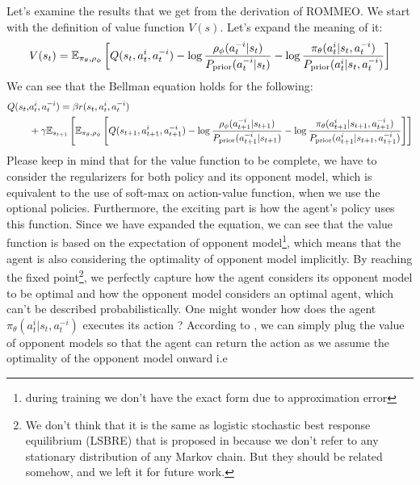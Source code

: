 Let's examine the results that we get from the derivation of ROMMEO. We start with the definition of value function $V(s)$. Let's expand the meaning of it:
\begin{equation}
    V(s_{t}) =\mathbb{E}_{\pi_\theta, \rho_\phi}\left[ Q(s_t, a^i_t, a^{-i}_t) - \log\frac{\rho_\phi(a^{-i}_t | s_t)}{P_{\text{prior}}(a^{-i}_t | s_t)} - \log\frac{\pi_{\theta}(a^i_t | s_t, a^{-i}_t) }{P_{\text{prior}}(a^i_t | s_t, a^{-i}_t)} \right]
\end{equation}
We can see that the Bellman equation holds for the following:
\begin{equation}
\begin{aligned}
\label{eqn:chap3-rollout-Q}
    Q(s_{t},& a^i_{t}, a^{-i}_{t}) = \beta r(s_t, a^i_t, a^{-i}_t) \\
    &+ \gamma\mathbb{E}_{s_{t+1}}\left[ \mathbb{E}_{\pi_\theta, \rho_\phi}\left[ Q(s_{t+1}, a^i_{t+1}, a^{-i}_{t+1}) - \log\frac{\rho_\phi(a^{-i}_{t+1} | s_{t+1})}{P_{\text{prior}}(a^{-i}_{t+1} | s_{t+1})} - \log\frac{\pi_{\theta}(a^i_{t+1} | s_{t+1}, a^{-i}_{t+1}) }{P_{\text{prior}}(a^i_{t+1} | s_{t+1}, a^{-i}_{t+1})} \right] \right]
\end{aligned}
\end{equation}
Please keep in mind that for the value function to be complete, we have to consider the regularizers for both policy and its opponent model, which is equivalent to the use of soft-max on action-value function, when we use the optional policies. Furthermore, the exciting part is how the agent's policy uses this function. Since we have expanded the equation, we can see that the value function is based on the expectation of  opponent model\footnote{during training we don't have the exact form due to approximation error}, which means that the agent is also considering the optimality of opponent model implicitly. By reaching the fixed point\footnote{We don't think that it is the same as logistic stochastic best response equilibrium (LSBRE) that is proposed in \cite{yu2019multi} because we don't refer to any stationary distribution of any Markov chain. But they should be related somehow, and we left it for future work.}, we perfectly capture how the agent considers its opponent model to be optimal and how the opponent model considers an optimal agent, which can't be described probabilistically. One might wonder how does the agent $\pi_\theta(a^i_t | s_t, a^{-i}_t)$ executes its action ? According to \cite{tian2019regularized}, we can simply plug the value of opponent models so that the agent can return the action as we assume the optimality of the opponent model onward i.e 
